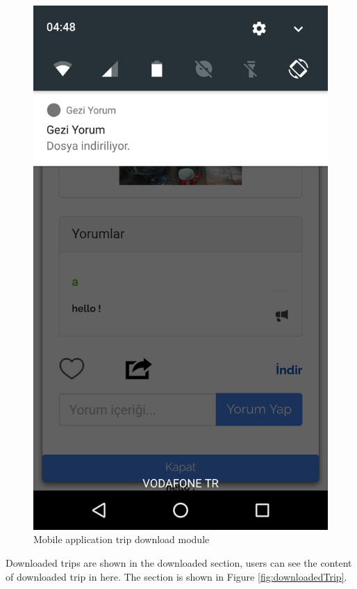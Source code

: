 \begin{figure}[!htbp]
\centering
\includegraphics[scale=0.09]{projectChapters/images/tripDownload.png}
\caption{Mobile application trip download module}
\label{fig:tripDownload}
\end{figure}


\newpage

Downloaded trips are shown in the downloaded section, users can see the content of downloaded trip in here. The section is shown in Figure 
\ref{fig:downloadedTrip}.

